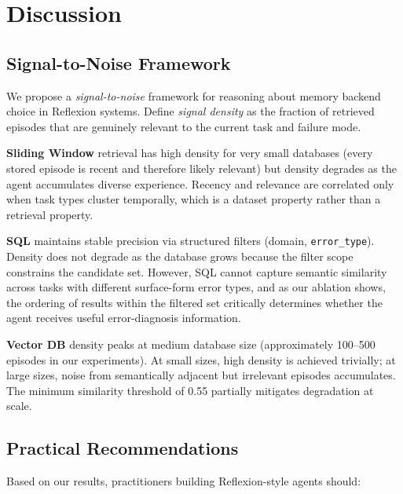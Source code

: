 \documentclass{article}
\begin{document}
\section{Discussion}
\label{sec:discussion}

\subsection{Signal-to-Noise Framework}

We propose a \emph{signal-to-noise} framework for reasoning about memory
backend choice in Reflexion systems. Define \emph{signal density} as the
fraction of retrieved episodes that are genuinely relevant to the current
task and failure mode.

\textbf{Sliding Window} retrieval has high density for very small databases
(every stored episode is recent and therefore likely relevant) but density
degrades as the agent accumulates diverse experience. Recency and relevance
are correlated only when task types cluster temporally, which is a dataset
property rather than a retrieval property.

\textbf{SQL} maintains stable precision via structured filters (domain,
\texttt{error\_type}). Density does not degrade as the database grows
because the filter scope constrains the candidate set. However, SQL cannot
capture semantic similarity across tasks with different surface-form error
types, and as our ablation shows, the ordering of results within the
filtered set critically determines whether the agent receives useful
error-diagnosis information.

\textbf{Vector DB} density peaks at medium database size (approximately
100--500 episodes in our experiments). At small sizes, high density is
achieved trivially; at large sizes, noise from semantically adjacent but
irrelevant episodes accumulates. The minimum similarity threshold of 0.55
partially mitigates degradation at scale.

\subsection{Practical Recommendations}

Based on our results, practitioners building Reflexion-style agents should:
\end{document}
